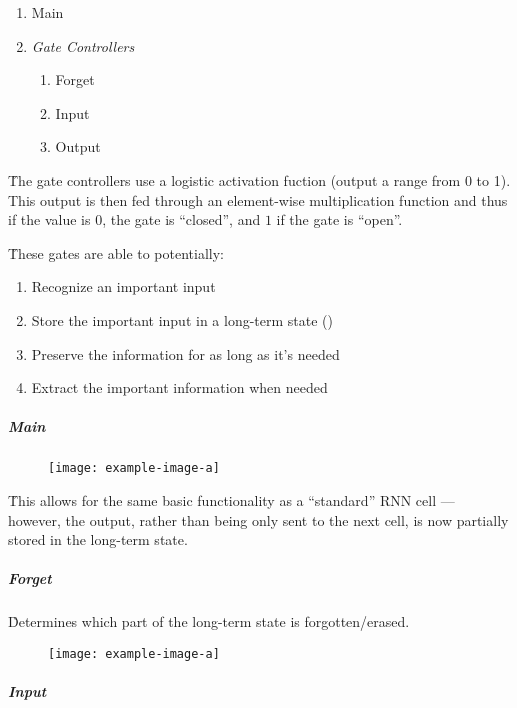 \begin{enumerate}[noitemsep,topsep=0pt]
	\item Main
	\item \textit{Gate Controllers}
	\begin{enumerate}[noitemsep,topsep=0pt]
		\item Forget
		\item Input
		\item Output
	\end{enumerate}
\end{enumerate}

\r{The gate controllers use a logistic activation fuction (output a range from 0 to 1). This output is then fed through an element-wise multiplication function and thus if the value is $0$, the gate is ``closed'', and $1$ if the gate is ``open''.}

\r{These gates are able to potentially:}

\begin{enumerate}[noitemsep,topsep=0pt]
	\item Recognize an important input
	\item Store the important input in a long-term state ()
	\item Preserve the information for as long as it's needed
	\item Extract the important information when needed
\end{enumerate}


\subparagraph{Main}

\begin{figure}
	\centering
	\texttt{[image: example-image-a]}\hfil
	\caption{}
\end{figure}

\r{This allows for the same basic functionality as a ``standard'' RNN cell --- however, the output, rather than being only sent to the next cell, is now partially stored in the long-term state.}


\subparagraph{Forget}

\r{Determines which part of the long-term state is forgotten/erased.}

\begin{figure}
	\centering
	\texttt{[image: example-image-a]}\hfil
	\caption{}
\end{figure}



\subparagraph{Input}

